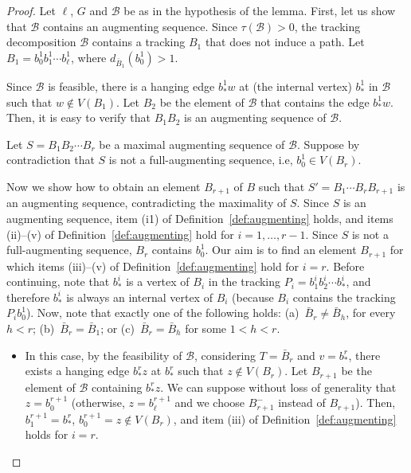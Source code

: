 \documentclass[12pt,reqno,a4paper]{amsart}
\newcommand{\B}{\mathcal{B}}
\newcommand{\full}{full}
\begin{document}
\begin{proof}
Let \(\ell\), \(G\) and $\B$ be as in the hypothesis of the lemma. 	
	First, let us show that \(\B\) contains an augmenting sequence.
	Since \(\tau(\B) > 0\), 
	the tracking decomposition \(\B\) contains a tracking \(B_1\) 
	that does not induce a path.
Let $B_1 = b_0^1b_1^1\cdots b_\ell^1$, where $d_{\bar B_1}(b^1_0)>1$. 
	
	Since \(\B\) is feasible, there is a hanging edge \(b_{*}^1w\) 
	at (the internal vertex) \(b_{*}^1\) in \(\B\) such that \(w\notin V(B_1)\).
	Let \(B_2\) be the element of \(\B\) that contains the edge \(b_{*}^1w\).
	Then, it is easy to verify that \(B_1B_2\) is an augmenting sequence of $\B$.
	
	Let \(S=B_1B_2\cdots B_r\) be a maximal augmenting sequence of $\B$.
	Suppose by contradiction that \(S\) is not a \full-augmenting sequence, i.e, \(b_0^1 \in V(B_r)\).
	

	Now we show how to obtain an element \(B_{r+1}\) of $B$ such that 
$S'=B_1\cdots B_rB_{r+1}$ is an augmenting sequence, contradicting the maximality 
of $S$. 
Since \(S\) is an augmenting sequence, item (i1) of Definition~\ref{def:augmenting} holds,
and items (ii)--(v) of Definition~\ref{def:augmenting} hold for \(i=1,\ldots,r-1\).
Since \(S\) is not a \full-augmenting sequence, \(B_r\) contains \(b_0^1\).
Our aim is to find an element \(B_{r+1}\) for which
items (iii)--(v) of Definition~\ref{def:augmenting} hold for \(i=r\).
Before continuing, note that \(b_*^i\) is a vertex of \(B_i\)
in the tracking \(P_i = b_1^ib_2^i\cdots b_{*}^i\), and
therefore \(b_*^i\) is always an internal vertex of \(B_i\) 
(because \(B_i\) contains the tracking \(P_i b_0^1\)).
Now, note that exactly one of the following holds: 
(a)~\(\bar B_r \neq \bar B_h\), for every \(h<r\);
(b)~\(\bar B_r = \bar B_1\); or
(c)~\(\bar B_r = \bar B_h\) for some \(1 < h < r\).



\begin{itemize}
\item[(a)] %
	In this case, by the feasibility of \(\B\), considering \(T=\bar B_r\)
	and \(v=b_{*}^r\), 
	there exists a hanging edge \(b_{*}^rz\) at \(b_{*}^r\) such that \(z\notin V(B_r)\).
	Let \(B_{r+1}\) be the element of \(\B\) containing \(b_{*}^rz\).
	We can suppose without loss of generality that \(z=b_0^{r+1}\)
	(otherwise, \(z = b_\ell^{r+1}\) and we choose \(B_{r+1}^-\) instead of \(B_{r+1}\)).
	Then, \(b_1^{r+1} = b_*^{r}\), \(b_0^{r+1} = z \notin V(B_r)\), and 
	item (iii) of Definition~\ref{def:augmenting} holds for \(i=r\).


\end{itemize}
\end{proof}
\end{document}
